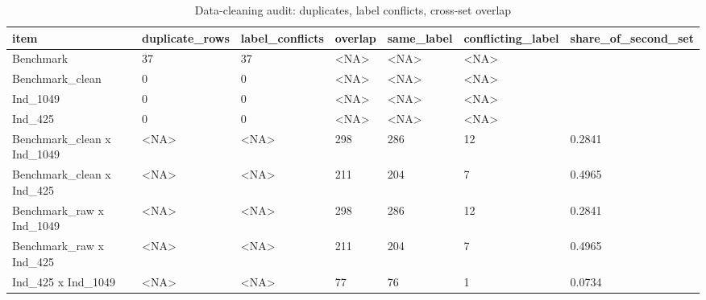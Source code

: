 \begin{table}[ht]
\centering\small
\caption{Data-cleaning audit: duplicates, label conflicts, cross-set overlap}
\label{tab:T3_2_data_cleaning_audit}
\begin{tabular}{lllllll}
\hline
item & duplicate\_rows & label\_conflicts & overlap & same\_label & conflicting\_label & share\_of\_second\_set \\
\hline
Benchmark & 37 & 37 & <NA> & <NA> & <NA> &  \\
Benchmark\_clean & 0 & 0 & <NA> & <NA> & <NA> &  \\
Ind\_1049 & 0 & 0 & <NA> & <NA> & <NA> &  \\
Ind\_425 & 0 & 0 & <NA> & <NA> & <NA> &  \\
Benchmark\_clean x Ind\_1049 & <NA> & <NA> & 298 & 286 & 12 & 0.2841 \\
Benchmark\_clean x Ind\_425 & <NA> & <NA> & 211 & 204 & 7 & 0.4965 \\
Benchmark\_raw x Ind\_1049 & <NA> & <NA> & 298 & 286 & 12 & 0.2841 \\
Benchmark\_raw x Ind\_425 & <NA> & <NA> & 211 & 204 & 7 & 0.4965 \\
Ind\_425 x Ind\_1049 & <NA> & <NA> & 77 & 76 & 1 & 0.0734 \\
\hline
\end{tabular}
\end{table}
